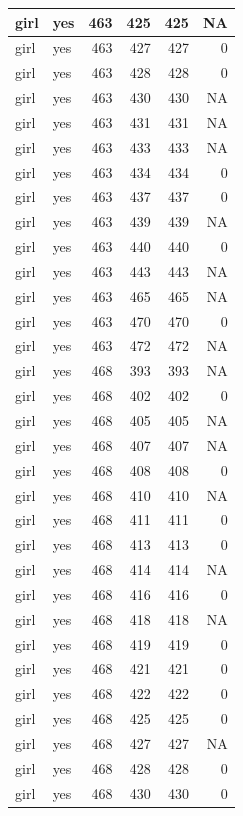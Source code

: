 \documentclass[man]{apa6}
\begin{document}
\begin{tabular}{l|l|r|r|r|r}
\hline
girl & yes & 463 & 425 & 425 & NA\\
\hline
girl & yes & 463 & 427 & 427 & 0\\
\hline
girl & yes & 463 & 428 & 428 & 0\\
\hline
girl & yes & 463 & 430 & 430 & NA\\
\hline
girl & yes & 463 & 431 & 431 & NA\\
\hline
girl & yes & 463 & 433 & 433 & NA\\
\hline
girl & yes & 463 & 434 & 434 & 0\\
\hline
girl & yes & 463 & 437 & 437 & 0\\
\hline
girl & yes & 463 & 439 & 439 & NA\\
\hline
girl & yes & 463 & 440 & 440 & 0\\
\hline
girl & yes & 463 & 443 & 443 & NA\\
\hline
girl & yes & 463 & 465 & 465 & NA\\
\hline
girl & yes & 463 & 470 & 470 & 0\\
\hline
girl & yes & 463 & 472 & 472 & NA\\
\hline
girl & yes & 468 & 393 & 393 & NA\\
\hline
girl & yes & 468 & 402 & 402 & 0\\
\hline
girl & yes & 468 & 405 & 405 & NA\\
\hline
girl & yes & 468 & 407 & 407 & NA\\
\hline
girl & yes & 468 & 408 & 408 & 0\\
\hline
girl & yes & 468 & 410 & 410 & NA\\
\hline
girl & yes & 468 & 411 & 411 & 0\\
\hline
girl & yes & 468 & 413 & 413 & 0\\
\hline
girl & yes & 468 & 414 & 414 & NA\\
\hline
girl & yes & 468 & 416 & 416 & 0\\
\hline
girl & yes & 468 & 418 & 418 & NA\\
\hline
girl & yes & 468 & 419 & 419 & 0\\
\hline
girl & yes & 468 & 421 & 421 & 0\\
\hline
girl & yes & 468 & 422 & 422 & 0\\
\hline
girl & yes & 468 & 425 & 425 & 0\\
\hline
girl & yes & 468 & 427 & 427 & NA\\
\hline
girl & yes & 468 & 428 & 428 & 0\\
\hline
girl & yes & 468 & 430 & 430 & 0\\

\end{tabular}
\end{document}
